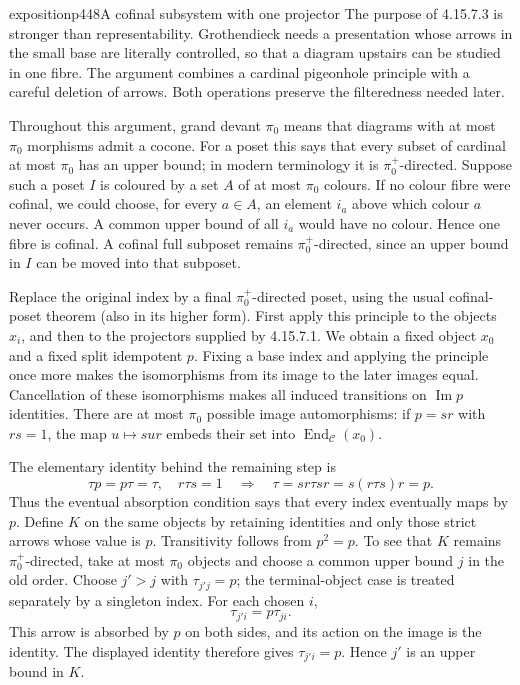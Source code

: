 \begin{dcomment}{exposition}{p448}{A cofinal subsystem with one projector}
The purpose of 4.15.7.3 is stronger than representability. Grothendieck needs a presentation whose arrows in the small base are literally controlled, so that a diagram upstairs can be studied in one fibre. The argument combines a cardinal pigeonhole principle with a careful deletion of arrows. Both operations preserve the filteredness needed later.

Throughout this argument, grand devant $\pi_0$ means that diagrams with at most $\pi_0$ morphisms admit a cocone. For a poset this says that every subset of cardinal at most $\pi_0$ has an upper bound; in modern terminology it is $\pi_0^+$-directed. Suppose such a poset $I$ is coloured by a set $A$ of at most $\pi_0$ colours. If no colour fibre were cofinal, we could choose, for every $a\in A$, an element $i_a$ above which colour $a$ never occurs. A common upper bound of all $i_a$ would have no colour. Hence one fibre is cofinal. A cofinal full subposet remains $\pi_0^+$-directed, since an upper bound in $I$ can be moved into that subposet.

Replace the original index by a final $\pi_0^+$-directed poset, using the usual cofinal-poset theorem (also \citealp[Proposition~5.3.1.18]{Lurie2009HTT} in its higher form). First apply this principle to the objects $x_i$, and then to the projectors supplied by 4.15.7.1. We obtain a fixed object $x_0$ and a fixed split idempotent $p$. Fixing a base index and applying the principle once more makes the isomorphisms from its image to the later images equal. Cancellation of these isomorphisms makes all induced transitions on $\operatorname{Im}p$ identities. There are at most $\pi_0$ possible image automorphisms: if $p=sr$ with $rs=1$, the map $u\mapsto sur$ embeds their set into $\operatorname{End}_{\mathcal C}(x_0)$.

The elementary identity behind the remaining step is
\[
\tau p=p\tau=\tau,\quad r\tau s=1
\quad\Longrightarrow\quad
\tau=sr\tau sr=s(r\tau s)r=p.
\]
Thus the eventual absorption condition says that every index eventually maps by $p$.
Define $K$ on the same objects by retaining identities and only those strict arrows whose value is $p$. Transitivity follows from $p^2=p$. To see that $K$ remains $\pi_0^+$-directed, take at most $\pi_0$ objects and choose a common upper bound $j$ in the old order. Choose $j'>j$ with $\tau_{j'j}=p$; the terminal-object case is treated separately by a singleton index. For each chosen $i$,
\[
\tau_{j'i}=p\tau_{ji}.
\]
This arrow is absorbed by $p$ on both sides, and its action on the image is the identity. The displayed identity therefore gives $\tau_{j'i}=p$. Hence $j'$ is an upper bound in $K$.


\end{dcomment}
